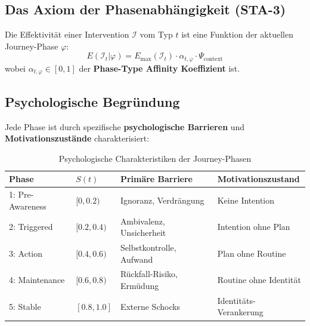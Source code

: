 \subsection{Das Axiom der Phasenabhängigkeit (STA-3)}

\begin{tcolorbox}[colback=blue!5!white, colframe=blue!75!black,
    title=Axiom STA-3: Phase-Dependent Intervention Efficacy]
Die Effektivität einer Intervention $\mathcal{I}$ vom Typ $t$ ist eine Funktion der aktuellen Journey-Phase $\varphi$:
\begin{equation}
E(\mathcal{I}_t | \varphi) = E_{\max}(\mathcal{I}_t) \cdot \alpha_{t,\varphi} \cdot \Psi_{\text{context}}
\label{eq:18-axiom-aw3}
\end{equation}
wobei $\alpha_{t,\varphi} \in [0, 1]$ der \textbf{Phase-Type Affinity Koeffizient} ist.
\end{tcolorbox}

\subsection{Psychologische Begründung}

Jede Phase ist durch spezifische \textbf{psychologische Barrieren} und \textbf{Motivationszustände} charakterisiert:

\begin{table}[htbp]
\centering
\caption{Psychologische Charakteristiken der Journey-Phasen}
\label{tab:18-phase-psychology}
\renewcommand{\arraystretch}{1.4}
\small
\begin{tabular}{@{}llll@{}}
\toprule
\textbf{Phase} & \textbf{$S(t)$} & \textbf{Primäre Barriere} & \textbf{Motivationszustand} \\
\midrule
1: Pre-Awareness & $[0, 0.2)$ & Ignoranz, Verdrängung & Keine Intention \\
2: Triggered & $[0.2, 0.4)$ & Ambivalenz, Unsicherheit & Intention ohne Plan \\
3: Action & $[0.4, 0.6)$ & Selbstkontrolle, Aufwand & Plan ohne Routine \\
4: Maintenance & $[0.6, 0.8)$ & Rückfall-Risiko, Ermüdung & Routine ohne Identität \\
5: Stable & $[0.8, 1.0]$ & Externe Schocks & Identitäts-Verankerung \\
\bottomrule
\end{tabular}
\end{table}


